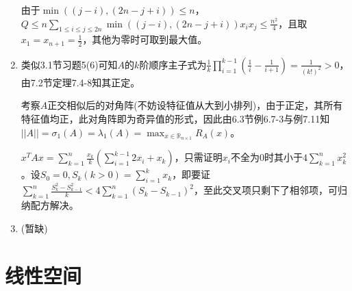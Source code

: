 \documentclass[a4paper,UTF8,fontset=windows]{ctexart}
\begin{document}
\begin{enumerate}
由于$\min((j-i),(2n-j+i))\le n$，$Q\le n\sum_{1\le i\le j\le 2n}\min((j-i),(2n-j+i))x_ix_j\le\frac{n^2}{4}$，且取$x_1=x_{n+1}=\frac{1}{2}$，其他为零时可取到最大值。

\item
类似3.1节习题5(6)可知$A$的$k$阶顺序主子式为$\frac{1}{k}\prod_{i=1}^{k-1}\left(\frac{1}{i}-\frac{1}{i+1}\right)=\frac{1}{(k!)^2}>0$，由7.2节定理7.4-8知其正定。

考察$A$正交相似后的对角阵(不妨设特征值从大到小排列)，由于正定，其所有特征值均正，此对角阵即为奇异值的形式，因此由6.3节例6.7-3与例7.11知$||A||=\sigma_1(A)=\lambda_1(A)=\max_{x\in\mathbb{R}_{n\times1}}R_A(x)$。

$x^TAx=\sum_{k=1}^n\frac{x_k}{k}\left(\sum_{i=1}^{k-1}2x_i+x_k\right)$，只需证明$x_i$不全为0时其小于$4\sum_{k=1}^nx_k^2$。设$S_0=0,S_k(k>0)=\sum_{i=1}^kx_k$，即要证$\sum_{k=1}^n\frac{S_k^2-S_{k-1}^2}{k}<4\sum_{k=1}^n(S_k-S_{k-1})^2$，至此交叉项只剩下了相邻项，可归纳配方解决。

\item
(暂缺)
\end{enumerate}

\section{线性空间}
\end{document}
